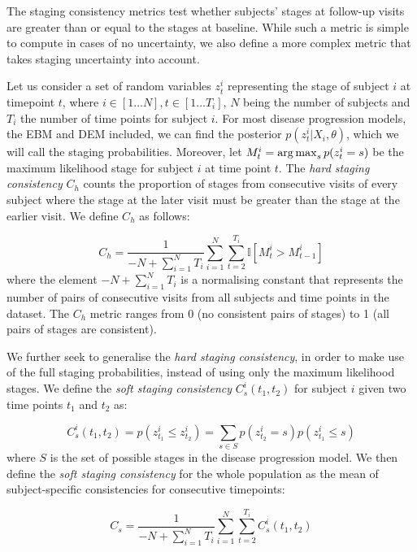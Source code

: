 The staging consistency metrics test whether subjects' stages at follow-up visits are greater than or equal to the stages at baseline. While such a metric is simple to compute in cases of no uncertainty, we also define a more complex metric that takes staging uncertainty into account. 

Let us consider a set of random variables $z_t^i$ representing the stage of subject $i$ at timepoint $t$, where $i \in [1 \dots N], t \in [1 \dots T_i]$, $N$ being the number of subjects and $T_i$ the number of time points for subject $i$. For most disease progression models, the EBM and DEM included, we can find the posterior $p(z_t^i|X_i, \theta)$, which we will call the staging probabilities. Moreover, let $M^i_t = \operatorname*{arg\,max}_s p(z_t^i = s)$ be the maximum likelihood stage for subject $i$ at time point $t$. The \emph{hard staging consistency} $C_h$ counts the proportion of stages from consecutive visits of every subject where the stage at the later visit must be greater than the stage at the earlier visit. We define $C_h$ as follows:

\begin{equation}
 C_h = \frac{1}{-N +\sum_{i=1}^N T_i} \sum_{i=1}^N \sum_{t=2}^{T_i} \mathbb{I}[M^i_t > M^i_{t-1}] 
\end{equation}
where the element $-N +\sum_{i=1}^N T_i$ is a normalising constant that represents the number of pairs of consecutive visits from all subjects and time points in the dataset. The $C_h$ metric ranges from 0 (no consistent pairs of stages) to 1 (all pairs of stages are consistent).


We further seek to generalise the \emph{hard staging consistency}, in order to make use of the full staging probabilities, instead of using only the maximum likelihood stages. We define the \emph{soft staging consistency} $C_s^i(t_1,t_2)$ for subject $i$ given two time points $t_1$ and $t_2$ as:

\begin{equation}
C_s^i(t_1,t_2) = p(z^i_{t_1} \leq z^i_{t_2}) = \sum_{s \in S} p(z^i_{t_2} = s) p(z^i_{t_1} \leq s) 
\end{equation}
where $S$ is the set of possible stages in the disease progression model. We then define the \emph{soft staging consistency} for the whole population as the mean of subject-specific consistencies for consecutive timepoints:

\begin{equation}
C_s = \frac{1}{-N +\sum_{i=1}^N T_i} \sum_{i=1}^N \sum_{t=2}^{T_i} C_s^i(t_1,t_2) 
\end{equation}

